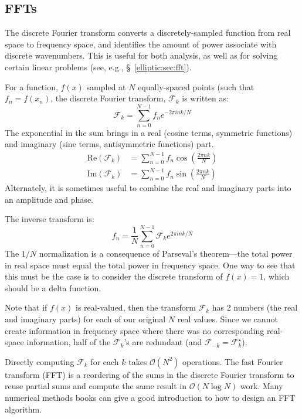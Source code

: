 \subsection{FFTs}

\label{sec:intro:ffts}

The discrete Fourier transform converts a discretely-sampled function
from real space to frequency space, and identifies the amount of power
associate with discrete wavenumbers.  This is useful for both
analysis, as well as for solving certain linear problems (see, e.g.,
\S~\ref{elliptic:sec:fft}).

For a function, $f(x)$ sampled at $N$ equally-spaced points (such that
$f_n = f(x_n)$, the discrete Fourier transform, $\mathcal{F}_k$ is
written as:
\begin{equation}
\mathcal{F}_k = \sum_{n=0}^{N-1} f_n e^{-2\pi i n k /N}
\end{equation}
The exponential in the sum brings in a real (cosine terms, symmetric
functions) and imaginary (sine terms, antisymmetric functions) part.
\begin{align}
\mathrm{Re}(\mathcal{F}_k) &= \sum_{n=0}^{N-1} f_n \cos\left(\frac{2\pi n k}{N}\right) \\
\mathrm{Im}(\mathcal{F}_k) &= \sum_{n=0}^{N-1} f_n \sin\left(\frac{2\pi n k}{N}\right)
\end{align}
Alternately, it is sometimes useful to combine the real and imaginary
parts into an amplitude and phase.

The inverse transform is:
\begin{equation}
f_n = \frac{1}{N} \sum_{n=0}^{N-1} \mathcal{F}_k e^{2\pi i n k /N}
\end{equation}
The $1/N$ normalization is a consequence of Parseval's theorem---the
total power in real space must equal the total power in frequency
space.  One way to see that this must be the case is to consider the
discrete transform of $f(x) = 1$, which should be a delta function.

Note that if $f(x)$ is real-valued, then the transform $\mathcal{F}_k$
has 2 numbers (the real and imaginary parts) for each of our original
$N$ real values.  Since we cannot create information in frequency
space where there was no corresponding real-space information, half of
the $\mathcal{F}_k$'s are redundant (and $\mathcal{F}_{-k} =
\mathcal{F}^\star_k$).

Directly computing $\mathcal{F}_k$ for each $k$ takes $\mathcal{O}(N^2)$
operations.  The fast Fourier transform (FFT) is a reordering of the
sums in the discrete Fourier transform to reuse partial sums and compute
the same result in $\mathcal{O}(N\log N)$ work.  Many numerical methods
books can give a good introduction to how to design an FFT algorithm.

